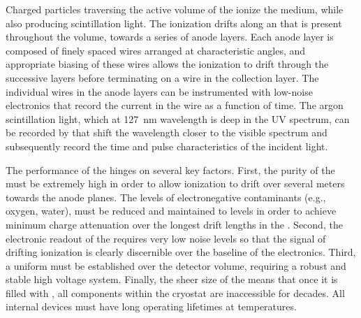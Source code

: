 Charged particles traversing the active volume of the \lartpc ionize the medium,
while also producing scintillation light.  The ionization drifts along
an \efield that is present throughout the volume, towards a series of
anode layers.  Each anode layer is composed of finely spaced wires arranged at
characteristic angles, and appropriate biasing of these wires allows the
ionization to drift through the successive layers before terminating on a wire
in the collection layer.  The individual wires in the anode layers can be
instrumented with low-noise electronics that record the current in the wire as
a function of time.  The argon scintillation light, which at \SI{127}{nm} wavelength
is deep in the UV spectrum, can be recorded by  that shift the
wavelength closer to the visible spectrum and subsequently record the time and
pulse characteristics of the incident light.



The performance of the \lartpc hinges on several key factors.  First, the
purity of the \lar must be extremely high in order to allow ionization to 
drift over several meters towards the anode planes.  The levels of
electronegative contaminants (e.g., oxygen, water), must be reduced and
maintained to  levels in order to achieve minimum charge attenuation
over the longest drift lengths in the \lartpc.   Second, the electronic readout
of the \lartpc requires very low noise levels so that the signal of drifting
ionization is clearly discernible over the baseline of the electronics.  
Third, a uniform \efield must be established over the detector volume, requiring a robust and stable high voltage system.  Finally, the sheer size of the  means that once it is filled with \lar, all components within the cryostat are inaccessible for decades.  All internal devices must have long operating lifetimes at \lar temperatures.

